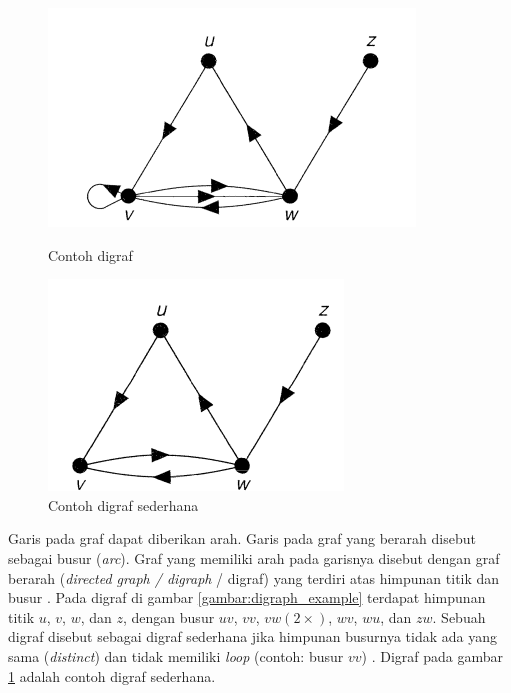 \documentclass[
	a4paper, %
	12pt, %
	unnumberedsections, %
	twoside, %
]{LTJournalArticle}
\begin{document}
\begin{figure}[!htb]
\begin{minipage}{0.48\linewidth}
	\centering
	\includegraphics[width=.7\linewidth]{gambar/digraph_example}
	\caption{Contoh digraf \citep{wilson1996}}
	\label{gambar:digraph_example}
\end{minipage}\hfill
\begin{minipage}{0.48\linewidth}
	\centering
	\includegraphics[width=.7\linewidth]{gambar/simple_digraph_example}
	\caption{Contoh digraf sederhana \citep{wilson1996}}
	\label{gambar:simple_digraph_example}
\end{minipage}
\end{figure}

Garis pada graf dapat diberikan arah. Garis pada graf yang berarah disebut sebagai busur (\textit{arc}). Graf yang memiliki arah pada garisnya disebut dengan graf berarah (\textit{directed graph / digraph} / digraf) yang terdiri atas himpunan titik dan busur \citep{wilson1996}. Pada digraf di gambar \ref{gambar:digraph_example} terdapat himpunan titik $u$, $v$, $w$, dan $z$, dengan busur $uv$, $vv$, $vw (2\times)$, $wv$, $wu$, dan $zw$. Sebuah digraf disebut sebagai digraf sederhana jika himpunan busurnya tidak ada yang sama (\textit{distinct}) dan tidak memiliki \textit{loop} (contoh: busur $vv$) \citep{wilson1996}. Digraf pada gambar \ref{gambar:simple_digraph_example} adalah contoh digraf sederhana.
\end{document}
